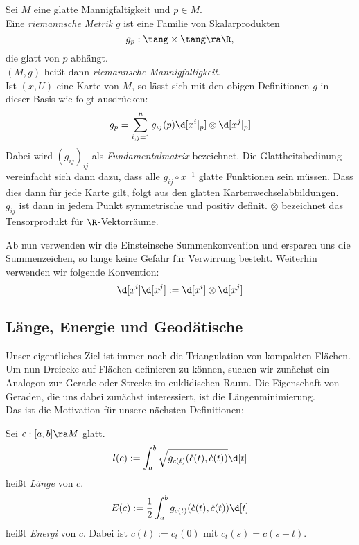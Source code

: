 \begin{defin}
  Sei $M$ eine glatte Mannigfaltigkeit und $p \in M$. \\
  Eine \emph{riemannsche Metrik} $g$ ist eine Familie von Skalarprodukten
  \[
  g_p : \tang \times \tang \ra \R,
  \]
  die glatt von $p$ abhängt. \\
  $(M,g)$ heißt dann \emph{riemannsche Mannigfaltigkeit}. \\
  Ist $(x,U)$ eine Karte von $M$, so lässt sich mit den obigen Definitionen $g$ in dieser Basis wie folgt ausdrücken:
  \[
  g_p = \sum_{i,j=1}^n g_{ij}(p) \d[x^i|_p] \otimes \d[x^j|_p]
  \]
  Dabei wird $(g_{ij})_{ij}$ als \emph{Fundamentalmatrix} bezeichnet. Die Glattheitsbedinung vereinfacht sich dann dazu, dass alle $g_{ij} \circ x^{-1}$ glatte Funktionen sein müssen. Dass dies dann für jede Karte gilt, folgt aus den glatten Kartenwechselabbildungen.\\
  $g_{ij}$ ist dann in jedem Punkt symmetrische und positiv definit. $\otimes$ bezeichnet das Tensorprodukt für $\R$-Vektorräume.
\end{defin}

\begin{rem}
  Ab nun verwenden wir die Einsteinsche Summenkonvention und ersparen uns die Summenzeichen, so lange keine Gefahr für Verwirrung besteht. Weiterhin verwenden wir folgende Konvention:
  \[
  \d[x^i]\d[x^j] := \d[x^i] \otimes \d[x^j]
  \]
\end{rem}

\subsection{Länge, Energie und Geodätische}

Unser eigentliches Ziel ist immer noch die Triangulation von kompakten Flächen. Um nun Dreiecke auf Flächen definieren zu können, suchen wir zunächst ein Analogon zur Gerade oder Strecke im euklidischen Raum. Die Eigenschaft von Geraden, die uns dabei zunächst interessiert, ist die Längenminimierung. \\
Das ist die Motivation für unsere nächsten Definitionen:

\begin{defin}
  Sei $c:[a,b] \ra M$ glatt.
  \[
  l(c) := \int_a^b \sqrt{g_{c(t)}(\dot c(t), \dot c(t))} \d[t]
  \]
  heißt \emph{Länge} von $c$. \\
  \[
  E(c) := \frac12 \int_a^b g_{c(t)} (\dot c(t), \dot c(t)) \d[t]
  \]
  heißt \emph{Energi} von $c$.
  Dabei ist $\dot c(t) := \dot c_t(0)$ mit $c_t(s) = c(s+t)$.
\end{defin}

